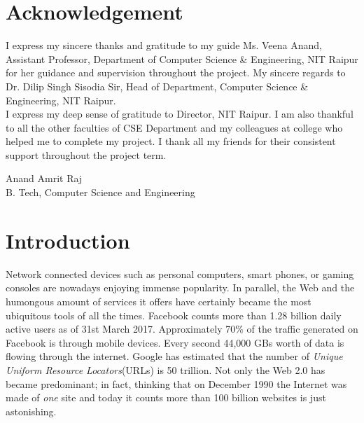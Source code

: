 \documentclass[12pt]{article}
\theoremstyle{definition}
\begin{document}
	
	\section*{\centering Acknowledgement}
	
	I express my sincere thanks and gratitude to my guide Ms. Veena Anand, Assistant Professor, Department of Computer Science \& Engineering, NIT Raipur for her guidance and supervision throughout the project. My sincere regards to Dr. Dilip Singh Sisodia Sir, Head of Department, Computer Science \& Engineering, NIT Raipur.\\
	
	I express my deep sense of gratitude to Director, NIT Raipur.  I am also thankful to all the other faculties of CSE Department and my colleagues at college who helped me to complete my project. I thank all my friends for their consistent support throughout the project term.
	
	\vspace{10pt}
	
	\begin{flushleft}
	Anand Amrit Raj\\
	B. Tech,  Computer Science and Engineering
	\end{flushleft}
	\cleardoublepage
	
	
	\tableofcontents{}
	\thispagestyle{empty}
	\cleardoublepage
		
	\listoffigures
	\cleardoublepage
	
	\listoftables
	\cleardoublepage
	
	\setcounter{page}{1}
	
	\cleardoublepage
	\section{Introduction}\label{sec:intro}
		
		Network connected devices such as personal computers, smart phones, or gaming consoles are nowadays enjoying immense popularity. In parallel, the Web and the humongous amount of services it offers have certainly became the most ubiquitous tools of all the times. Facebook counts more than 1.28 billion daily active users as of 31st March 2017. Approximately 70\% of the traffic generated on Facebook is through mobile devices. Every second 44,000 GBs worth of data is flowing through the internet. Google has estimated that the number of \textit{Unique Uniform Resource Locators}(URLs) is 50 trillion. Not only the Web 2.0 has became predominant; in fact, thinking that on December 1990 the Internet was made of \textit{one} site and today it counts more than 100 billion websites is just astonishing.
		
\end{document}
